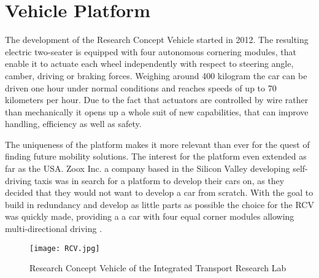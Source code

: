 \chapter{Vehicle Platform}
The development of the Research Concept Vehicle started in 2012. The resulting electric two-seater is equipped with four autonomous cornering modules, that enable it to actuate each wheel independently with respect to steering angle, camber, driving or braking forces. Weighing around 400 kilogram the car can be driven one hour under normal conditions and reaches speeds of up to 70 kilometers per hour. Due to the fact that actuators are controlled by wire rather than mechanically it opens up a whole suit of new capabilities, that can improve handling, efficiency as well as safety.

The uniqueness of the platform makes it more relevant than ever for the quest of finding future mobility solutions. The interest for the platform even extended as far as the USA. Zoox Inc. a company based in the Silicon Valley developing self-driving taxis was in search for a platform to develop their cars on, as they decided that they would not want to develop a car from scratch. With the goal to build in redundancy and develop as little parts as possible the choice for the RCV was quickly made, providing a a car with four equal corner modules allowing multi-directional driving \cite{Harris.2015}.

\begin{figure}[h]
\texttt{[image: RCV.jpg]}
\caption[Research Concept Vehicle of the ITRL]{Research Concept Vehicle of the Integrated Transport Research Lab}
\label{fig:RCV}
\end{figure}
